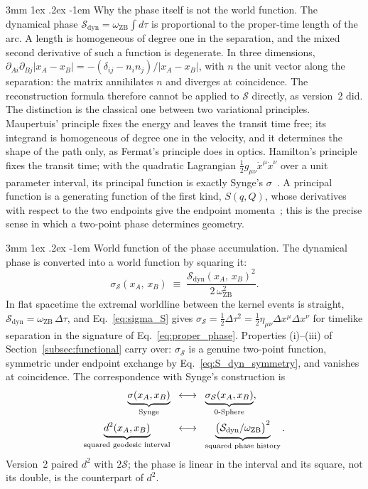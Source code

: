 \documentclass[%
 reprint, amsmath,amssymb, aps, prb, ]{revtex4-2}
\makeatletter
\numberwithin{equation}{section}
\renewcommand\paragraph{%
  \@startsection{paragraph}{4}{\z@}%
    {3mm \@plus 1ex \@minus .2ex}%
    {-1em}%
    {\normalfont\normalsize\itshape}}
\newcommand{\omZB}{\omega_{\text{ZB}}}
\makeatother
\begin{document}
\paragraph{Why the phase itself is not the world function.} The dynamical phase $\mathcal{S}_{\mathrm{dyn}} = \omZB\int d\tau$ is proportional to the proper-time length of the arc. A length is homogeneous of degree one in the separation, and the mixed second derivative of such a function is degenerate. In three dimensions, $\partial_{A i}\partial_{B j}|x_A - x_B| = -(\delta_{ij} - n_in_j)/|x_A - x_B|$, with $n$ the unit vector along the separation: the matrix annihilates $n$ and diverges at coincidence. The reconstruction formula therefore cannot be applied to $\mathcal{S}$ directly, as version~2 did. The distinction is the classical one between two variational principles. Maupertuis' principle fixes the energy and leaves the transit time free; its integrand is homogeneous of degree one in the velocity, and it determines the shape of the path only, as Fermat's principle does in optics. Hamilton's principle fixes the transit time; with the quadratic Lagrangian $\tfrac12 g_{\mu\nu}\dot{x}^\mu\dot{x}^\nu$ over a unit parameter interval, its principal function is exactly Synge's $\sigma$~\cite{Synge1960, Yukawa1954}. A principal function is a generating function of the first kind, $S(q, Q)$, whose derivatives with respect to the two endpoints give the endpoint momenta~\cite{Yukawa1954}; this is the precise sense in which a two-point phase determines geometry.

\paragraph{World function of the phase accumulation.} The dynamical phase is converted into a world function by squaring it:
\begin{equation}
\sigma_{\mathcal{S}}(x_A,\, x_B) \;\equiv\; \frac{\mathcal{S}_{\mathrm{dyn}}(x_A,\, x_B)^2}{2\,\omZB^2}.
\label{eq:sigma_S}
\end{equation}
In flat spacetime the extremal worldline between the kernel events is straight, $\mathcal{S}_{\mathrm{dyn}} = \omZB\,\Delta\tau$, and Eq.~\eqref{eq:sigma_S} gives $\sigma_{\mathcal{S}} = \tfrac12\Delta\tau^2 = \tfrac12\eta_{\mu\nu}\Delta x^\mu\Delta x^\nu$ for timelike separation in the signature of Eq.~\eqref{eq:proper_phase}. Properties (i)--(iii) of Section~\ref{subsec:functional} carry over: $\sigma_{\mathcal{S}}$ is a genuine two-point function, symmetric under endpoint exchange by Eq.~\eqref{eq:S_dyn_symmetry}, and vanishes at coincidence. The correspondence with Synge's construction is
\begin{align}
\underbrace{\sigma(x_A, x_B)}_{\text{Synge}}
&\;\;\longleftrightarrow\;\;
\underbrace{\sigma_{\mathcal{S}}(x_A, x_B)}_{\text{0-Sphere}},
\label{eq:synge_correspondence}\\
\underbrace{d^2(x_A, x_B)}_{\text{squared geodesic interval}}
&\;\;\longleftrightarrow\;\;
\underbrace{\big(\mathcal{S}_{\mathrm{dyn}}/\omZB\big)^2}_{\text{squared phase history}}.
\notag
\end{align}
Version~2 paired $d^2$ with $2\mathcal{S}$; the phase is linear in the interval and its square, not its double, is the counterpart of $d^2$.
\end{document}
